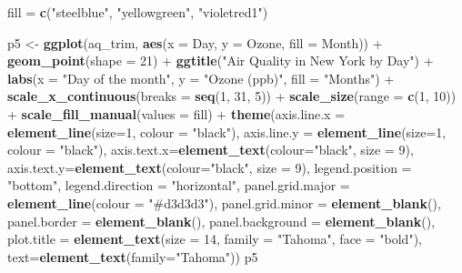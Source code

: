 \documentclass[]{article}
\newenvironment{Shaded}{\begin{snugshade}}{\end{snugshade}}
\newcommand{\KeywordTok}[1]{\textcolor[rgb]{0.13,0.29,0.53}{\textbf{{#1}}}}
\newcommand{\DataTypeTok}[1]{\textcolor[rgb]{0.13,0.29,0.53}{{#1}}}
\newcommand{\DecValTok}[1]{\textcolor[rgb]{0.00,0.00,0.81}{{#1}}}
\newcommand{\StringTok}[1]{\textcolor[rgb]{0.31,0.60,0.02}{{#1}}}
\newcommand{\NormalTok}[1]{{#1}}
\begin{document}
\begin{Shaded}
\begin{Highlighting}[]
\NormalTok{fill =}\StringTok{ }\KeywordTok{c}\NormalTok{(}\StringTok{"steelblue"}\NormalTok{, }\StringTok{"yellowgreen"}\NormalTok{, }\StringTok{"violetred1"}\NormalTok{)}

\NormalTok{p5 <-}\StringTok{ }\KeywordTok{ggplot}\NormalTok{(aq_trim, }\KeywordTok{aes}\NormalTok{(}\DataTypeTok{x =} \NormalTok{Day, }\DataTypeTok{y =} \NormalTok{Ozone, }\DataTypeTok{fill =} \NormalTok{Month)) +}
\StringTok{      }\KeywordTok{geom_point}\NormalTok{(}\DataTypeTok{shape =} \DecValTok{21}\NormalTok{) +}
\StringTok{      }\KeywordTok{ggtitle}\NormalTok{(}\StringTok{"Air Quality in New York by Day"}\NormalTok{) +}\StringTok{ }
\StringTok{      }\KeywordTok{labs}\NormalTok{(}\DataTypeTok{x =} \StringTok{"Day of the month"}\NormalTok{, }\DataTypeTok{y =} \StringTok{"Ozone (ppb)"}\NormalTok{, }\DataTypeTok{fill =} \StringTok{"Months"}\NormalTok{) +}
\StringTok{      }\KeywordTok{scale_x_continuous}\NormalTok{(}\DataTypeTok{breaks =} \KeywordTok{seq}\NormalTok{(}\DecValTok{1}\NormalTok{, }\DecValTok{31}\NormalTok{, }\DecValTok{5}\NormalTok{)) +}
\StringTok{      }\KeywordTok{scale_size}\NormalTok{(}\DataTypeTok{range =} \KeywordTok{c}\NormalTok{(}\DecValTok{1}\NormalTok{, }\DecValTok{10}\NormalTok{)) +}
\StringTok{      }\KeywordTok{scale_fill_manual}\NormalTok{(}\DataTypeTok{values =} \NormalTok{fill) +}
\StringTok{      }\KeywordTok{theme}\NormalTok{(}\DataTypeTok{axis.line.x =} \KeywordTok{element_line}\NormalTok{(}\DataTypeTok{size=}\DecValTok{1}\NormalTok{, }\DataTypeTok{colour =} \StringTok{"black"}\NormalTok{), }
            \DataTypeTok{axis.line.y =} \KeywordTok{element_line}\NormalTok{(}\DataTypeTok{size=}\DecValTok{1}\NormalTok{, }\DataTypeTok{colour =} \StringTok{"black"}\NormalTok{), }
            \DataTypeTok{axis.text.x=}\KeywordTok{element_text}\NormalTok{(}\DataTypeTok{colour=}\StringTok{"black"}\NormalTok{, }\DataTypeTok{size =} \DecValTok{9}\NormalTok{), }
            \DataTypeTok{axis.text.y=}\KeywordTok{element_text}\NormalTok{(}\DataTypeTok{colour=}\StringTok{"black"}\NormalTok{, }\DataTypeTok{size =} \DecValTok{9}\NormalTok{),  }
            \DataTypeTok{legend.position =} \StringTok{"bottom"}\NormalTok{, }\DataTypeTok{legend.direction =} \StringTok{"horizontal"}\NormalTok{,}
            \DataTypeTok{panel.grid.major =} \KeywordTok{element_line}\NormalTok{(}\DataTypeTok{colour =} \StringTok{"#d3d3d3"}\NormalTok{), }
            \DataTypeTok{panel.grid.minor =} \KeywordTok{element_blank}\NormalTok{(), }
            \DataTypeTok{panel.border =} \KeywordTok{element_blank}\NormalTok{(), }\DataTypeTok{panel.background =} \KeywordTok{element_blank}\NormalTok{(),}
            \DataTypeTok{plot.title =} \KeywordTok{element_text}\NormalTok{(}\DataTypeTok{size =} \DecValTok{14}\NormalTok{, }\DataTypeTok{family =} \StringTok{"Tahoma"}\NormalTok{, }\DataTypeTok{face =} \StringTok{"bold"}\NormalTok{),}
            \DataTypeTok{text=}\KeywordTok{element_text}\NormalTok{(}\DataTypeTok{family=}\StringTok{"Tahoma"}\NormalTok{)) }
\NormalTok{p5}
\end{Highlighting}
\end{Shaded}
\end{document}
